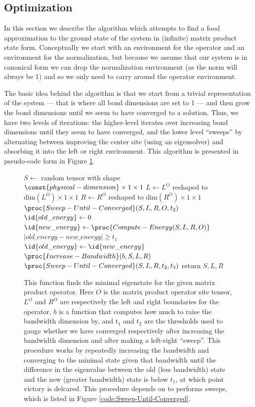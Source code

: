 \documentclass{article}
\begin{document}
\subsection{Optimization}

In this section we describe the algorithm which attempts to find a food approximation to the ground state of the system in (infinite) matrix product state form.  Conceptually we start with an environment for the operator and an environment for the normalization, but because we assume that our system is in canonical form we can drop the normalization environment (as the norm will always be 1) and so we only need to carry around the operator environment.

The basic idea behind the algorithm is that we start from a trivial representation of the system --- that is where all bond dimensions are set to 1 --- and then grow the bond dimensions until we seem to have converged to a solution.  Thus, we have two levels of iterations:  the higher-level iterates over increasing bond dimensions until they seem to have converged, and the lower level ``sweeps'' by alternating between improving the center site (using an eigensolver) and absorbing it into the left or right environment.  This algorithm is presented in pseudo-code form in Figure \ref{code:Compute-Ground-State}.

\begin{figure}
\begin{codebox}
\li $S \gets$ random tensor with shape $\const{physical-dimension}\times1\times 1$
\li $L \gets L^O$ reshaped to $\text{dim}(L^O)\times1\times1$
\li $R \gets R^O$ reshaped to $\text{dim}(R^O)\times1\times1$
\li $\proc{Sweep-Until-Converged}(S,L,R,O,t_2)$
\li $\id{old\_energy} \gets 0$
\li $\id{new\_energy} \gets  \proc{Compute-Energy(S,L,R,O)}$
\li \While $|old\_energy-new\_energy| \ge t_1$
\li     \Do
\li         $\id{old\_energy} \gets \id{new\_energy}$
\li         $\proc{Increase-Bandwidth}(b,S,L,R)$
\li         $\proc{Sweep-Until-Converged}(S,L,R,t_2,t_3)$
\End
\li return $S,L,R$
\end{codebox}
\caption{\label{code:Compute-Ground-State} This function finds the minimal eigenstate for the given matrix product operator.  Here $O$ is the matrix product operator site tensor, $L^O$ and $R^O$ are respectively the left and right boundaries for the operator, $b$ is a function that computes how much to raise the bandwidth dimension by, and $t_1$ and $t_2$ are the thresholds used to gauge whether we have converged respectively after increasing the bandwidth dimension and after making a left-right ``sweep''.  This procedure works by repeatedly increasing the bandwidth and converging to the minimal state given that bandwidth until the difference in the eigenvalue between the old (less bandwidth) state and the new (greater bandwidth) state is below $t_1$, at which point victory is delcared. This procedure depends on  to performs sweeps, which is listed in Figure \ref{code:Sweep-Until-Converged}.}
\end{figure}
\end{document}
